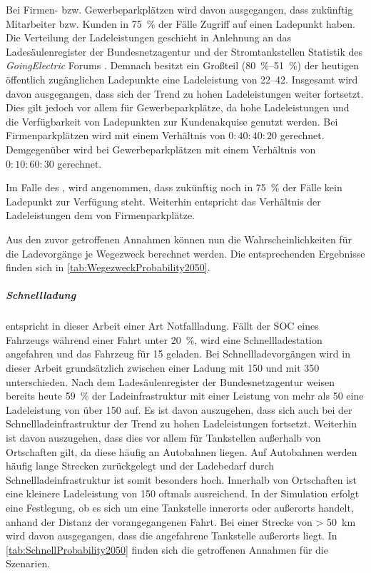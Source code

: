 Bei Firmen- bzw. Gewerbeparkplätzen wird davon ausgegangen, dass zukünftig Mitarbeiter bzw. Kunden in \SI{75}{\percent} der Fälle Zugriff auf einen Ladepunkt haben.
Die Verteilung der Ladeleistungen geschieht in Anlehnung an das Ladesäulenregister der Bundesnetzagentur \cite[][Stand: ]{BundesnetzagenturElektrizitaet2020} und der Stromtankstellen Statistik des \textit{GoingElectric} Forums \cite[][Stand: ]{Weemaes2020}.
Demnach besitzt ein Großteil (\SIrange[range-phrase=~bzw.~]{80}{51}{\percent}) der heutigen öffentlich zugänglichen Ladepunkte eine Ladeleistung von \SIrange{22}{42}{\kw}.
Insgesamt wird davon ausgegangen, dass sich der Trend zu hohen Ladeleistungen weiter fortsetzt.
Dies gilt jedoch vor allem für Gewerbeparkplätze, da hohe Ladeleistungen und die Verfügbarkeit von Ladepunkten zur Kundenakquise genutzt werden.
Bei Firmenparkplätzen wird mit einem Verhältnis von \(0:40:40:20\) gerechnet.
Demgegenüber wird bei Gewerbeparkplätzen mit einem Verhältnis von \(0:10:60:30\) gerechnet.\medskip

Im Falle des \UCs \Straszenranddot, wird angenommen, dass zukünftig noch in \SI{75}{\percent} der Fälle kein Ladepunkt zur Verfügung steht.
Weiterhin entspricht das Verhältnis der Ladeleistungen dem von Firmenparkplätze.\medskip

Aus den zuvor getroffenen Annahmen können nun die Wahrscheinlichkeiten für die Ladevorgänge je Wegezweck berechnet werden.
Die entsprechenden Ergebnisse finden sich in \autoref{tab:WegezweckProbability2050}.




\subparagraph{Schnellladung} entspricht in dieser Arbeit einer Art Notfallladung.
Fällt der \gls{SOC} eines Fahrzeugs während einer Fahrt unter \SI{20}{\percent}, wird eine Schnellladestation angefahren und das Fahrzeug für \SI{15}{\Minuten} geladen.
Bei Schnellladevorgängen wird in dieser Arbeit grundsätzlich zwischen einer Ladung mit \SI{150}{\kw} und mit \SI{350}{\kw} unterschieden.
Nach dem Ladesäulenregister der Bundesnetzagentur \cite[][Stand: ]{BundesnetzagenturElektrizitaet2020} weisen bereits heute \SI{59}{\percent} der Ladeinfrastruktur mit einer Leistung von mehr als \SI{50}{\kw} eine Ladeleistung von über \SI{150}{\kw} auf.
Es ist davon auszugehen, dass sich auch bei der Schnellladeinfrastruktur der Trend zu hohen Ladeleistungen fortsetzt.
Weiterhin ist davon auszugehen, dass dies vor allem für Tankstellen außerhalb von Ortschaften gilt, da diese häufig an Autobahnen liegen.
Auf Autobahnen werden häufig lange Strecken zurückgelegt und der Ladebedarf durch Schnellladeinfrastruktur ist somit besonders hoch.
Innerhalb von Ortschaften ist eine kleinere Ladeleistung von \SI{150}{\kw} oftmals ausreichend.
In der Simulation erfolgt eine Festlegung, ob es sich um eine Tankstelle innerorts oder außerorts handelt, anhand der Distanz der vorangegangenen Fahrt.
Bei einer Strecke von \SI{> 50}{\km} wird davon ausgegangen, dass die angefahrene Tankstelle außerorts liegt.
In \autoref{tab:SchnellProbability2050} finden sich die getroffenen Annahmen für die Szenarien.

